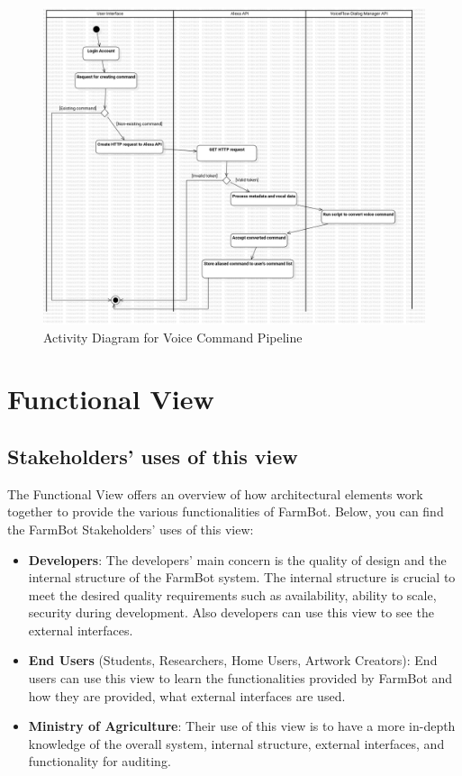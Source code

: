 \begin{figure}[H]
    \centering
    \includegraphics[width=1\textwidth]{Figures/SuggestedActivityDiagram.png}
    \caption{Activity Diagram for Voice Command Pipeline}\label{fig:suggested_activity}
\end{figure}





\section{Functional View}

\subsection{Stakeholders’ uses of this view}

The Functional View offers an overview of how architectural elements work together to provide the various functionalities of FarmBot. Below, you can find the FarmBot Stakeholders' uses of this view:
\begin{itemize}
    \item \textbf{Developers}: The developers' main concern is the quality of design and the internal structure of the FarmBot system. The internal structure is crucial to meet the desired quality requirements such as availability, ability to scale, security during development. Also developers can use this view to see the external interfaces.
    \item \textbf{End Users} (Students, Researchers, Home Users, Artwork Creators): End users can use this view to learn the functionalities provided by FarmBot and how they are provided, what external interfaces are used.
    \item \textbf{Ministry of Agriculture}: Their use of this view is to have a more in-depth knowledge of the overall system, internal structure, external interfaces, and functionality for auditing.
\end{itemize}

